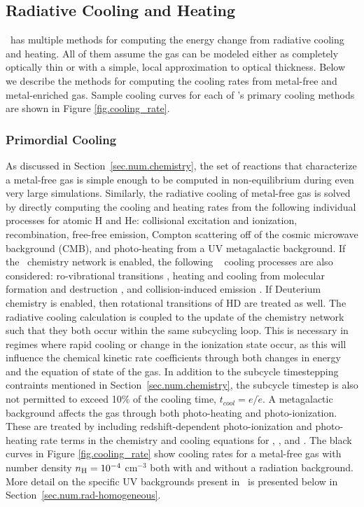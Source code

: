 \subsection{Radiative Cooling and Heating}
\label{sec.num.cooling}

\enzo\ has multiple methods for computing the energy change from radiative
cooling and heating.  All of them assume the gas can be modeled either as
completely optically thin or with a simple, local approximation to optical
thickness.  Below we describe the methods for computing the cooling rates from
metal-free and metal-enriched gas.  Sample cooling curves for each of \enzo's
primary cooling methods are shown in Figure \ref{fig.cooling_rate}.

\subsubsection{Primordial Cooling}

As discussed in Section~\ref{sec.num.chemistry}, the set of reactions that
characterize a metal-free gas is simple enough to be computed in
non-equilibrium during even very large simulations.  Similarly, the radiative
cooling of metal-free gas is solved by directly computing the cooling
and heating rates from the following individual processes for atomic H
and He: collisional excitation and ionization, recombination,
free-free emission, Compton scattering off of the cosmic microwave
background (CMB), and photo-heating from a UV metagalactic background.
If the \HH~chemistry network is enabled, the following \HH~
cooling processes are also considered: ro-vibrational transitions
\citep{2008MNRAS.388.1627G,1998A&A...335..403G}, heating and cooling from molecular
formation and destruction \citep{2009Sci...325..601T}, and
collision-induced emission \citep{2004MNRAS.348.1019R}.  If Deuterium
chemistry is enabled, then rotational transitions of HD
\citep{1998A&A...335..403G, 1983ApJ...270..578L} are treated as well.  The
radiative cooling calculation is coupled to the update of the chemistry network
such that they both occur within the same subcycling loop.  This is necessary
in regimes where rapid cooling or change in the ionization state occur, as this
will influence the chemical kinetic rate coefficients through both changes in
energy and the equation of state of the gas.  In addition to the subcycle
timestepping contraints mentioned in Section~\ref{sec.num.chemistry}, the
subcycle timestep is also not permitted to exceed 10\% of the cooling time,
$t_{cool} = e/\dot{e}$.  A metagalactic background affects the gas through both
photo-heating and photo-ionization.  These are treated by including
redshift-dependent photo-ionization and photo-heating rate terms in the
chemistry and cooling equations for , , and .
The black curves in Figure \ref{fig.cooling_rate} show cooling rates for a
metal-free gas with number density $n_{\rm H} = 10^{-4}$ cm$^{-3}$ both with
and without a radiation background.  More detail on the specific UV backgrounds
present in \enzo\ is presented below in Section~\ref{sec.num.rad-homogeneous}.

